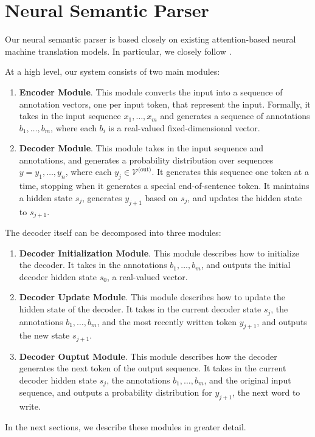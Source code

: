 \documentclass[11pt,letterpaper]{article}
\newcommand{\vocabout}{\mathcal{V}^{\text{(out)}}}
\begin{document}
\section{Neural Semantic Parser}
Our neural semantic parser is based closely on existing
attention-based neural machine translation models.
In particular, we closely follow \cite{luong2015translation}.

At a high level, our system consists of two main modules:
\begin{enumerate}
  \item \textbf{Encoder Module}.  This module 
    converts the input into a sequence of annotation vectors,
    one per input token, that represent the input.
    Formally, it takes in the input sequence
    $x_1, \dotsc, x_m$ and generates a sequence of 
    annotations $b_1, \dotsc, b_m$,
    where each $b_i$ is a real-valued fixed-dimensional vector.
  \item \textbf{Decoder Module}.  This module
    takes in the input sequence and annotations,
    and generates a probability distribution
    over sequences $y = y_1, \dotsc, y_n$,
    where each $y_j \in \vocabout$.
    It generates this sequence one token at a time,
    stopping when it generates a special end-of-sentence token.
    It maintains a hidden state $s_j$,
    generates $y_{j+1}$ based on $s_j$,
    and updates the hidden state to $s_{j+1}$.
\end{enumerate}
The decoder itself can be decomposed into three modules:
\begin{enumerate}
  \item \textbf{Decoder Initialization Module}.
    This module describes how to initialize the decoder.
    It takes in the annotations $b_1, \dotsc, b_m$, and
    outputs the initial decoder hidden state $s_0$,
    a real-valued vector.
  \item \textbf{Decoder Update Module}.  This module describes
    how to update the hidden state of the decoder.
    It takes in the current decoder state $s_{j}$,
    the annotations $b_1, \dotsc, b_m$, and the most recently
    written token $y_{j+1}$, and outputs the new state $s_{j+1}$.
  \item \textbf{Decoder Ouptut Module}.  This module
    describes how the decoder generates the next token of the 
    output sequence.
    It takes in the current decoder hidden state $s_{j}$,
    the annotations $b_1, \dotsc, b_m$,
    and the original input sequence,
    and outputs a probability distribution 
    for $y_{j+1}$, the next word to write.
\end{enumerate}
In the next sections, we describe these modules in greater detail.
\end{document}
